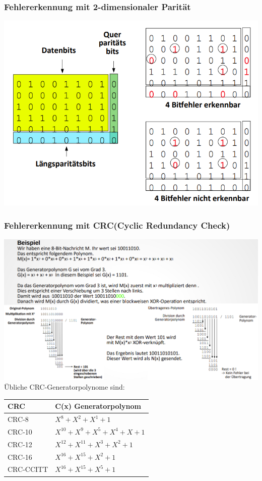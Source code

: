 \documentclass[12pt,a4paper]{article}
\begin{document}
			\subsubsection{Fehlererkennung mit 2-dimensionaler Parität}
				\includegraphics[width=\textwidth]{Bilder/2-dim-paritaet.PNG}
			\subsubsection{Fehlererkennung mit CRC(Cyclic Redundancy Check)}
				\includegraphics[width=\textwidth]{Bilder/crc1.PNG}
				Übliche CRC-Generatorpolynome sind:
				\begin{center}
					\begin{tabularx}{9cm}{X|l}
						\textbf{CRC}& \textbf{C(x) Generatorpolynom}\\
						\hline
						CRC-8& $X^8 + X^2 + X^1 + 1$\\
						CRC-10& $X^{10} + X^9 + X^5 + X^4 + X + 1$\\
						CRC-12& $X^{12} + X^{11} + X^3 + X^2 + 1$\\
						CRC-16& $X^{16} + X^{15} + X^2 + 1$\\
						CRC-CCITT& $X^{16} + X^{15} + X^5 + 1$\\
					\end{tabularx}
				\end{center}
			
\end{document}
